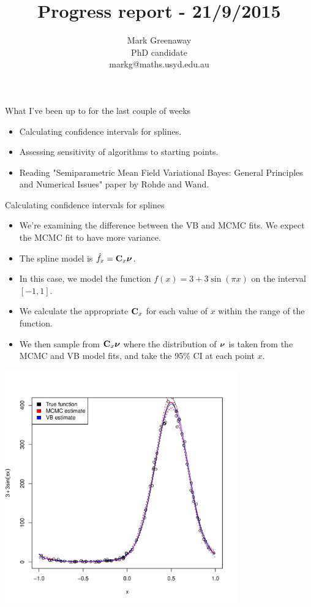 \documentclass{beamer}
\title{Progress report - 21/9/2015}
\author{Mark Greenaway\\PhD candidate\\markg@maths.usyd.edu.au}
\begin{document}
\begin{frame}
\maketitle
\end{frame}

\begin{frame}{What I've been up to for the last couple of weeks}
\begin{itemize}
\item Calculating confidence intervals for splines.
\item Assessing sensitivity of algorithms to starting points.
\item Reading "Semiparametric Mean Field Variational Bayes: General Principles and Numerical Issues" paper
			by Rohde and Wand.
\end{itemize}
\end{frame}

\begin{frame}{Calculating confidence intervals for splines}
\begin{itemize}
\item We're examining the difference between the VB and MCMC fits. We expect the MCMC fit to have
more variance.
\item The spline model is $\hat{f}_x = {\bf C}_x {\boldsymbol \nu}$.
\item In this case, we model the function $f(x) = 3 + 3 \sin(\pi x)$ on the interval $[-1, 1]$.
\item We calculate the appropriate ${\bf C}_x$ for each value of $x$ within the range of the function.
\item We then sample from ${\bf C}_x {\boldsymbol \nu}$ where the distribution of ${\boldsymbol \nu}$ is taken from the MCMC and VB
			model fits, and take the 95\% CI at each point $x$.
\end{itemize}
\end{frame}

\begin{frame}
\includegraphics[height=10cm, width=10cm]{code/results/accuracy_plots_spline_gva2.pdf}
\end{frame}
\end{document}
